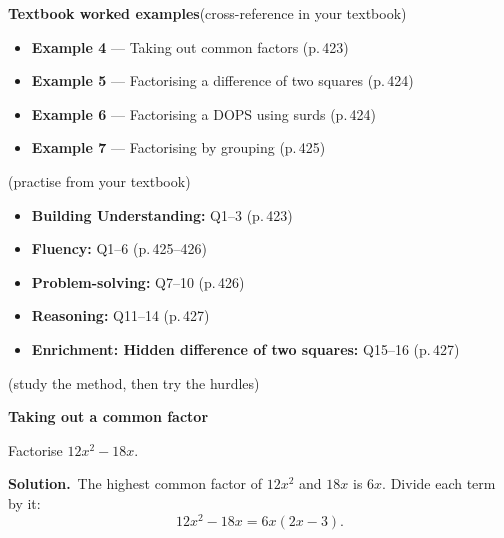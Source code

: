 \documentclass[11pt]{article}
\begin{document}
\begin{refbox}
{\bfseries\color{chalkdk}Textbook worked examples}\;\textcolor{inksoft}{\small(cross-reference in your textbook)}\\[3pt]
\begin{itemize}[leftmargin=16pt,itemsep=1pt,topsep=2pt]
  \item \textbf{Example 4} --- Taking out common factors \textcolor{inksoft}{(p.\,423)}
  \item \textbf{Example 5} --- Factorising a difference of two squares \textcolor{inksoft}{(p.\,424)}
  \item \textbf{Example 6} --- Factorising a DOPS using surds \textcolor{inksoft}{(p.\,424)}
  \item \textbf{Example 7} --- Factorising by grouping \textcolor{inksoft}{(p.\,425)}
\end{itemize}
\;\textcolor{inksoft}{\small(practise from your textbook)}\\[3pt]
\begin{itemize}[leftmargin=16pt,itemsep=1pt,topsep=2pt]
  \item \textbf{Building Understanding:} Q1--3 \textcolor{inksoft}{(p.\,423)}
  \item \textbf{Fluency:} Q1--6 \textcolor{inksoft}{(p.\,425--426)}
  \item \textbf{Problem-solving:} Q7--10 \textcolor{inksoft}{(p.\,426)}
  \item \textbf{Reasoning:} Q11--14 \textcolor{inksoft}{(p.\,427)}
  \item \textbf{Enrichment: Hidden difference of two squares:} Q15--16 \textcolor{inksoft}{(p.\,427)}
\end{itemize}\end{refbox}

\;\textcolor{inksoft}{\small(study the method, then try the hurdles)}\par

\begin{workedbox}

{\bfseries\color{chalkdk}Taking out a common factor}\par\vspace{3pt}

Factorise $12x^2-18x$.\par\vspace{2pt}

{\bfseries Solution.}\ The highest common factor of $12x^2$ and $18x$ is $6x$. Divide each term by it: \[12x^2-18x=6x(2x-3).\]

\end{workedbox}
\end{document}
